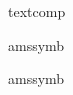 \documentclass[a4paper,10pt]{article}
\begin{document}
\mathcommand{\Downarrow}
\mathcommand{\longleftarrow}
\mathcommand{\nwarrow}
\mathcommand{\downarrow}
\mathcommand{\Longleftarrow}
\mathcommand{\Rightarrow}
\mathcommand{\hookleftarrow}
\mathcommand{\longleftrightarrow}
\mathcommand{\rightarrow}
\mathcommand{\hookrightarrow}
\mathcommand{\Longleftrightarrow}
\mathcommand{\searrow}
\mathcommand{\leadsto}
\mathcommand{\longmapsto}
\mathcommand{\swarrow}
\mathcommand{\leftarrow}
\mathcommand{\Longrightarrow}
\mathcommand{\uparrow}
\mathcommand{\Leftarrow}
\mathcommand{\longrightarrow}
\mathcommand{\Uparrow}
\mathcommand{\Leftrightarrow}
\mathcommand{\mapsto}
\mathcommand{\updownarrow}
\mathcommand{\leftrightarrow}
\mathcommand{\nearrow}
\mathcommand{\Updownarrow}
\par
\begin{neededpkgs}{textcomp}
\command{\textdownarrow}
\command{\textrightarrow}
\command{\textleftarrow}
\command{\textuparrow}
\end{neededpkgs}
\par
\begin{neededpkgs}{amssymb}
\mathcommand{\circlearrowleft}
\mathcommand{\leftleftarrows}
\mathcommand{\rightleftarrows}
\mathcommand{\circlearrowright}
\mathcommand{\leftrightarrows}
\mathcommand{\rightrightarrows}
\mathcommand{\curvearrowleft}
\mathcommand{\leftrightsquigarrow}
\mathcommand{\rightsquigarrow}
\mathcommand{\curvearrowright}
\mathcommand{\Lleftarrow}
\mathcommand{\Rsh}
\mathcommand{\dashleftarrow}
\mathcommand{\looparrowleft}
\mathcommand{\twoheadleftarrow}
\mathcommand{\dashrightarrow}
\mathcommand{\looparrowright}
\mathcommand{\twoheadrightarrow}
\mathcommand{\downdownarrows}
\mathcommand{\Lsh}
\mathcommand{\upuparrows}
\mathcommand{\leftarrowtail}
\mathcommand{\rightarrowtail}
\par
\mathcommand{\nLeftarrow}
\mathcommand{\nLeftrightarrow}
\mathcommand{\nRightarrow}
\mathcommand{\nleftarrow}
\mathcommand{\nleftrightarrow}
\mathcommand{\nrightarrow}
\end{neededpkgs}
\par
\mathcommand{\leftharpoondown}
\mathcommand{\rightharpoondown}
\mathcommand{\rightleftharpoons}
\mathcommand{\leftharpoonup}
\mathcommand{\rightharpoonup}
\par
\begin{neededpkgs}{amssymb}
\mathcommand{\downharpoonleft}
\mathcommand{\leftrightharpoons}
\mathcommand{\upharpoonleft}
\mathcommand{\downharpoonright}
\mathcommand{\upharpoonright}
\end{neededpkgs}
\end{document}
